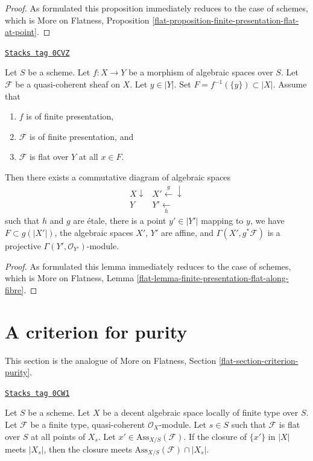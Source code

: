 \begin{proof}
As formulated this proposition immediately reduces
to the case of schemes, which is
More on Flatness, Proposition
\ref{flat-proposition-finite-presentation-flat-at-point}.
\end{proof}

\begin{lemma}
\label{spaces-flat-lemma-finite-presentation-flat-along-fibre}
\href{https://stacks.math.columbia.edu/tag/0CVZ}{\texttt{Stacks tag 0CVZ}}

Let $S$ be a scheme.
Let $f : X \to Y$ be a morphism of algebraic spaces over $S$.
Let $\mathcal{F}$ be a quasi-coherent sheaf on $X$.
Let $y \in |Y|$. Set $F = f^{-1}(\{y\}) \subset |X|$. Assume that
\begin{enumerate}
\item $f$ is of finite presentation,
\item $\mathcal{F}$ is of finite presentation, and
\item $\mathcal{F}$ is flat over $Y$ at all $x \in F$.
\end{enumerate}
Then there exists a commutative diagram of algebraic spaces
$$
\begin{array}{cc}X \downarrow & X' \overset{g}{\longleftarrow}\downarrow \\ Y & Y' \underset{h}{\longleftarrow}\end{array}
$$
such that $h$ and $g$ are \'etale, there is a point
$y' \in |Y'|$ mapping to $y$, we have $F \subset g(|X'|)$,
the algebraic spaces $X'$, $Y'$ are affine, and
$\Gamma(X', g^*\mathcal{F})$ is a projective
$\Gamma(Y', \mathcal{O}_{Y'})$-module.
\end{lemma}

\begin{proof}
As formulated this lemma immediately reduces
to the case of schemes, which is
More on Flatness, Lemma
\ref{flat-lemma-finite-presentation-flat-along-fibre}.
\end{proof}

\section{A criterion for purity}
\label{spaces-flat-section-criterion-purity}
This section is the analogue of More on Flatness, Section
\ref{flat-section-criterion-purity}.

\begin{lemma}
\label{spaces-flat-lemma-associated-point-specializes}
\href{https://stacks.math.columbia.edu/tag/0CW1}{\texttt{Stacks tag 0CW1}}

Let $S$ be a scheme. Let $X$ be a decent algebraic space
locally of finite type over $S$.
Let $\mathcal{F}$ be a finite type, quasi-coherent $\mathcal{O}_X$-module.
Let $s \in S$ such that $\mathcal{F}$ is flat over $S$ at all points of $X_s$.
Let $x' \in \text{Ass}_{X/S}(\mathcal{F})$. If
the closure of $\{x'\}$ in $|X|$ meets $|X_s|$, then the closure
meets $\text{Ass}_{X/S}(\mathcal{F}) \cap |X_s|$.
\end{lemma}

